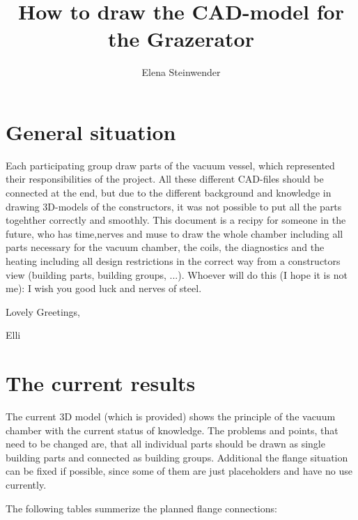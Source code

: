 \documentclass{article}
\title{How to draw the CAD-model for the Grazerator}
\author{Elena Steinwender}
\begin{document}
\maketitle
\newpage

\section{General situation}

Each participating group draw parts of the vacuum vessel, which represented their responsibilities of the project.
All these different CAD-files should be connected at the end, but due to the different background and knowledge in drawing 3D-models of the constructors, it was not possible to put all the parts togehther correctly and smoothly.
This document is a recipy for someone in the future, who has time,nerves and muse to draw the whole chamber including all parts necessary for the vacuum chamber, the coils, the diagnostics and the heating including all design restrictions in the correct way from a constructors view (building parts, building groups, ...).
Whoever will do this (I hope it is not me): I wish you good luck and nerves of steel.

Lovely Greetings,

Elli

\newpage

\section{The current results}

The current 3D model (which is provided) shows the principle of the vacuum chamber with the current status of knowledge.
The problems and points, that need to be changed are, that all individual parts should be drawn as single building parts and connected as building groups.
Additional the flange situation can be fixed if possible, since some of them are just placeholders and have no use currently.

The following tables summerize the planned flange connections:
\end{document}
